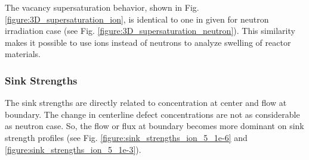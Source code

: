 \documentclass[a4paper]{article}
\begin{document}
      The vacancy supersaturation behavior, shown in Fig. \ref{figure:3D_supersaturation_ion}, is identical to one in given for neutron irradiation case (see Fig. \ref{figure:3D_supersaturation_neutron}). This similarity makes it possible to use ions instead of neutrons to analyze swelling of reactor materials.

      \newpage
    \subsubsection{Sink Strengths} \hspace{10pt}
    The sink strengths are directly related to concentration at center and flow at boundary. The change in centerline defect concentrations are not as considerable as neutron case. So, the flow or flux at boundary becomes more dominant on sink strength profiles (see Fig. \ref{figure:sink_strengths_ion_5_1e-6} and \ref{figure:sink_strengths_ion_5_1e-3}).
\end{document}
